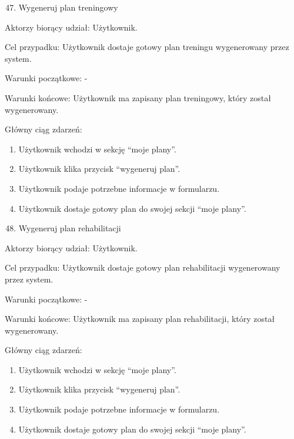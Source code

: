 {}

\begin{enumerate}
\setcounter{enumi}{46}
\tightlist
\item
  {Wygeneruj plan treningowy}
\end{enumerate}

{Aktorzy biorący udział: Użytkownik.}

{Cel przypadku: Użytkownik dostaje gotowy plan treningu wygenerowany
przez system.}

{Warunki początkowe: -}

{Warunki końcowe: Użytkownik ma zapisany plan treningowy, który został
wygenerowany.}

{Główny ciąg zdarzeń:}

\begin{enumerate}
\tightlist
\item
  {Użytkownik wchodzi w sekcję ``moje plany''.}
\item
  {Użytkownik klika przycisk ``wygeneruj plan''.}
\item
  {Użytkownik podaje potrzebne informacje w formularzu.}
\item
  {Użytkownik dostaje gotowy plan do swojej sekcji ``moje plany''.}
\end{enumerate}

{}

\begin{enumerate}
\setcounter{enumi}{47}
\tightlist
\item
  {Wygeneruj plan rehabilitacji}
\end{enumerate}

{Aktorzy biorący udział: Użytkownik.}

{Cel przypadku: Użytkownik dostaje gotowy plan rehabilitacji
wygenerowany przez system.}

{Warunki początkowe: -}

{Warunki końcowe: Użytkownik ma zapisany plan rehabilitacji, który
został wygenerowany.}

{Główny ciąg zdarzeń:}

\begin{enumerate}
\tightlist
\item
  {Użytkownik wchodzi w sekcję ``moje plany''.}
\item
  {Użytkownik klika przycisk ``wygeneruj plan''.}
\item
  {Użytkownik podaje potrzebne informacje w formularzu.}
\item
  {Użytkownik dostaje gotowy plan do swojej sekcji ``moje plany''.}
\end{enumerate}

